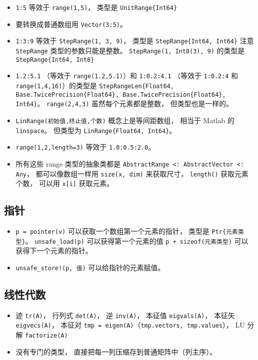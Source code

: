 \begin{itemize}
\item \verb`1:5` 等效于 \verb`range(1,5)`， 类型是 \verb`UnitRange{Int64}`
\item 要转换成普通数组用 \verb`Vector(3:5)`。
\item \verb`1:3:9` 等效于 \verb`StepRange(1, 3, 9)`， 类型是 \verb`StepRange{Int64, Int64}` 注意 \verb`StepRange` 类型的参数只能是整数。 \verb`StepRange(1, Int8(3), 9)` 的类型是 \verb`StepRange{Int64, Int8}`
\item \verb`1.2:5.1` （等效于 \verb`range(1.2,5.1)`）和 \verb`1:0.2:4.1` （等效于 \verb`1:0.2:4` 和 \verb`range(1,4,16)`）的类型是 \verb`StepRangeLen{Float64, Base.TwicePrecision{Float64}, Base.TwicePrecision{Float64}, Int64}`。 \verb`range(2,4,3)` 虽然每个元素都是整数， 但类型也是一样的。
\item \verb`LinRange(初始值,终止值,个数)` 概念上是等间距数组， 相当于 Matlab 的 \verb`linspace`。 但类型为 \verb`LinRange{Float64, Int64}`。
\item \verb`range(1,2,length=3)` 等效于 \verb`1.0:0.5:2.0`。
\item 所有这些 range 类型的抽象类都是 \verb`AbstractRange <: AbstractVector <: Any`， 都可以像数组一样用 \verb`size(x, dim)` 来获取尺寸， \verb`length()` 获取元素个数， 可以用 \verb`x[i]` 获取元素。
\end{itemize}

\subsection{指针}
\begin{itemize}
\item \verb`p = pointer(v)` 可以获取一个数组第一个元素的指针， 类型是 \verb`Ptr{元素类型}`。 \verb`unsafe_load(p)` 可以获得第一个元素的值 \verb`p + sizeof(元素类型)` 可以获得下一个元素的指针。
\item \verb`unsafe_store!(p, 值)` 可以给指针的元素赋值。
\end{itemize}

\subsection{线性代数}
\begin{itemize}
\item 迹 \verb`tr(A)`， 行列式 \verb`det(A)`， 逆 \verb`inv(A)`， 本征值 \verb`eigvals(A)`， 本征矢 \verb`eigvecs(A)`， 本征对 \verb`tmp = eigen(A)`（\verb`tmp.vectors, tmp.values`）， LU 分解%
\verb`factorize(A)`
\item {}没有专门的类型， 直接把每一列压缩存到普通矩阵中（列主序）。
\end{itemize}

